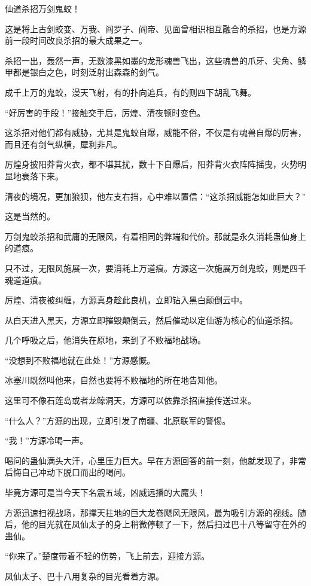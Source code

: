 \begin{this_body}
仙道杀招万剑鬼蛟！

这是将上古剑蛟变、万我、阎罗子、阎帝、见面曾相识相互融合的杀招，也是方源前一段时间改良杀招的最大成果之一。

杀招一出，轰然一声，无数漆黑如墨的龙形魂兽飞出，这些魂兽的爪牙、尖角、鳞甲都是银白之色，时刻泛射出森森的剑气。

成千上万的鬼蛟，漫天飞射，有的扑向追兵，有的则四下胡乱飞舞。

“好厉害的手段！”接触交手后，厉煌、清夜顿时变色。

这杀招对他们都有威胁，尤其是鬼蛟自爆，威能不俗，不仅是有魂兽自爆的厉害，而且还有剑气纵横，犀利非凡。

厉煌身披阳莽背火衣，都不堪其扰，数十下自爆后，阳莽背火衣阵阵摇曳，火势明显地衰落下来。

清夜的境况，更加狼狈，他左支右挡，心中难以置信：“这杀招威能怎如此巨大？”

这是当然的。

万剑鬼蛟杀招和武庸的无限风，有着相同的弊端和代价。那就是永久消耗蛊仙身上的道痕。

只不过，无限风施展一次，要消耗上万道痕。方源这一次施展万剑鬼蛟，则是四千魂道道痕。

厉煌、清夜被纠缠，方源真身趁此良机，立即钻入黑白颠倒云中。

从白天进入黑天，方源立即摧毁颠倒云，然后催动以定仙游为核心的仙道杀招。

几个呼吸之后，他消失在原地，来到了不败福地战场。

“没想到不败福地就在此处！”方源感慨。

冰塞川既然叫他来，自然也要将不败福地的所在地告知他。

这里可不像石莲岛或者龙鲸洞天，方源可以依靠杀招直接传送过来。

“什么人？”方源的出现，立即引发了南疆、北原联军的警惕。

“我！”方源冷喝一声。

喝问的蛊仙满头大汗，心里压力巨大。早在方源回答的前一刻，他就发现了，非常后悔自己冲动下脱口而出的喝问。

毕竟方源可是当今天下名震五域，凶威远播的大魔头！

方源迅速扫视战场，那撑天拄地的巨大龙卷飓风无限风，最为吸引方源的视线。随后，他的目光就在凤仙太子的身上稍微停顿了一下，然后扫过巴十八等留守在外的蛊仙。

“你来了。”楚度带着不轻的伤势，飞上前去，迎接方源。

凤仙太子、巴十八用复杂的目光看着方源。


\end{this_body}
